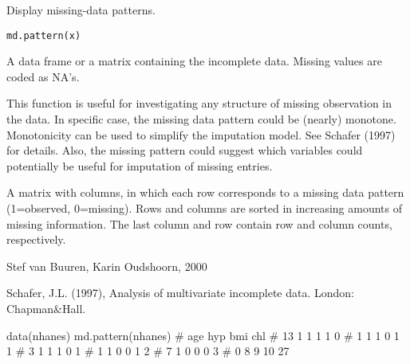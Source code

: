\documentclass{article}
\begin{document}
\begin{Description}\relax
Display missing-data patterns.
\end{Description}
\begin{Usage}
\begin{verbatim}
md.pattern(x)
\end{verbatim}
\end{Usage}
\begin{Arguments}
\begin{ldescription}
\item[\code{x}] A data frame or a matrix containing the incomplete data. 
Missing values are coded as NA's. 
\end{ldescription}
\end{Arguments}
\begin{Details}\relax
This function is useful for investigating any structure of missing 
observation in the data. In specific case, the missing data pattern 
could be (nearly) monotone. Monotonicity can be used to simplify the 
imputation model. See Schafer (1997) for details. Also, the missing
pattern could suggest which variables could potentially be useful for
imputation of missing entries.
\end{Details}
\begin{Value}
A matrix with  columns, in which each row corresponds to
a missing data pattern (1=observed, 0=missing). 
Rows and columns are sorted in increasing amounts of missing 
information. The last column and row contain row and column counts,
respectively.
\end{Value}
\begin{Author}\relax
Stef van Buuren, Karin Oudshoorn, 2000
\end{Author}
\begin{References}\relax
Schafer, J.L. (1997), Analysis of multivariate incomplete data. 
London: Chapman\&Hall.
\end{References}
\begin{Examples}
\begin{ExampleCode}
data(nhanes)
md.pattern(nhanes)
#     age hyp bmi chl    
#  13   1   1   1   1  0
#   1   1   1   0   1  1
#   3   1   1   1   0  1
#   1   1   0   0   1  2
#   7   1   0   0   0  3
#   0   8   9  10 27

\end{ExampleCode}
\end{Examples}
\end{document}
